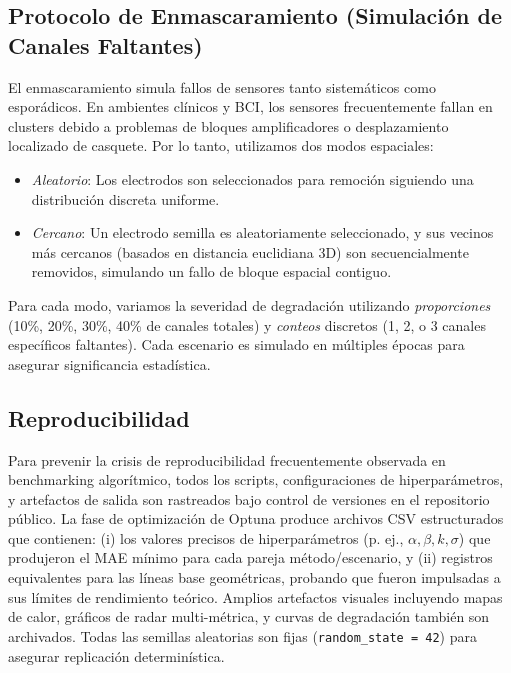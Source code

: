\subsection{Protocolo de Enmascaramiento (Simulación de Canales Faltantes)}
El enmascaramiento simula fallos de sensores tanto sistemáticos como esporádicos. En ambientes clínicos y BCI, los sensores frecuentemente fallan en clusters debido a problemas de bloques amplificadores o desplazamiento localizado de casquete. Por lo tanto, utilizamos dos modos espaciales:
\begin{itemize}
\item \emph{Aleatorio}: Los electrodos son seleccionados para remoción siguiendo una distribución discreta uniforme.
\item \emph{Cercano}: Un electrodo semilla es aleatoriamente seleccionado, y sus vecinos más cercanos (basados en distancia euclidiana 3D) son secuencialmente removidos, simulando un fallo de bloque espacial contiguo.
\end{itemize}
Para cada modo, variamos la severidad de degradación utilizando \emph{proporciones} (10\%, 20\%, 30\%, 40\% de canales totales) y \emph{conteos} discretos (1, 2, o 3 canales específicos faltantes). Cada escenario es simulado en múltiples épocas para asegurar significancia estadística.

\subsection{Reproducibilidad}
Para prevenir la crisis de reproducibilidad frecuentemente observada en benchmarking algorítmico, todos los scripts, configuraciones de hiperparámetros, y artefactos de salida son rastreados bajo control de versiones en el repositorio público. La fase de optimización de Optuna produce archivos CSV estructurados que contienen: (i) los valores precisos de hiperparámetros (p. ej., $\alpha, \beta, k, \sigma$) que produjeron el MAE mínimo para cada pareja método/escenario, y (ii) registros equivalentes para las líneas base geométricas, probando que fueron impulsadas a sus límites de rendimiento teórico. Amplios artefactos visuales incluyendo mapas de calor, gráficos de radar multi-métrica, y curvas de degradación también son archivados. Todas las semillas aleatorias son fijas (\texttt{random\_state = 42}) para asegurar replicación determinística.

